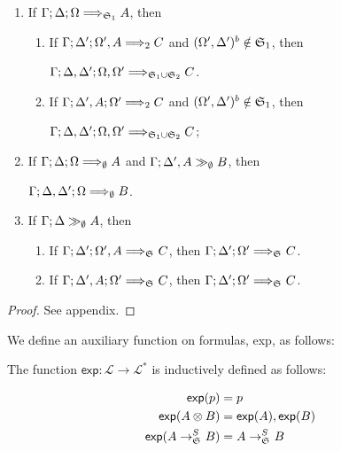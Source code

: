 \begin{theorem}\mbox{}

  \begin{enumerate}
  \item If $\Gamma; \Delta; \Omega \Longrightarrow_{\mathfrak{S}_{1}} A$, then
    \begin{enumerate}
    \item If $\Gamma; \Delta'; \Omega', A \Longrightarrow_{2} C$ and
      $(\Omega', \Delta')^{b} \notin \mathfrak{S}_{1}$, then

      $\Gamma; \Delta, \Delta'; \Omega, \Omega' \Longrightarrow_{
        \mathfrak{S}_{1} \cup \mathfrak{S}_{2}} C$.
    \item If $\Gamma; \Delta', A; \Omega' \Longrightarrow_{2} C$ and
      $(\Omega', \Delta')^{b} \notin \mathfrak{S}_{1}$, then

      $\Gamma; \Delta, \Delta'; \Omega, \Omega' \Longrightarrow_{
        \mathfrak{S}_{1} \cup \mathfrak{S}_{2}} C$;
    \end{enumerate}

  \item If $\Gamma; \Delta; \Omega \Longrightarrow_{\emptyset} A$ and
    $\Gamma; \Delta', A \gg_{\emptyset} B$, then

    $\Gamma; \Delta, \Delta'; \Omega \Longrightarrow_{\emptyset} B$.

  \item If $\Gamma; \Delta \gg_{\emptyset} A$, then
    \begin{enumerate}
    \item If $\Gamma; \Delta'; \Omega', A \Longrightarrow_{\mathfrak{S}_{}} C$, then
      $\Gamma; \Delta'; \Omega' \Longrightarrow_{\mathfrak{S}_{}} C$.
    \item If $\Gamma; \Delta', A; \Omega' \Longrightarrow_{\mathfrak{S}_{}} C$, then
      $\Gamma; \Delta'; \Omega' \Longrightarrow_{\mathfrak{S}_{}} C$.
    \end{enumerate}

  \end{enumerate}
\end{theorem}
\begin{proof}
  See appendix.
\end{proof}


We define an auxiliary function on formulas, \textsf{exp}, as follows:

\begin{definition}
  The function $\textsf{exp} : \mathcal{L} \to \mathcal{L}^*$ is inductively
  defined as follows:

\begin{align*}
  \textsf{exp}(p) & = p \\
  \textsf{exp}(A \otimes B) & = \textsf{exp}(A), \textsf{exp}(B) \\
  \textsf{exp}(A \rightarrow_{\mathfrak{S}_{}}^S B) & = A \rightarrow_{\mathfrak{S}_{}}^S B
\end{align*}
\end{definition}


